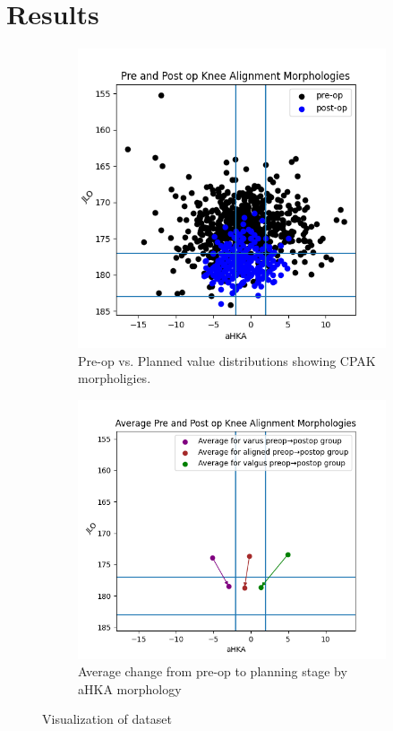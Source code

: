 \documentclass{article}
\begin{document}
	
\section{Results}

\begin{figure}[h]
	\begin{subfigure}{.45\linewidth}
		\includegraphics[width=\linewidth]{data_vis.png}
		\caption{Pre-op vs. Planned value distributions showing CPAK morpholigies.}
		\label{data_vis}
	\end{subfigure}
	\hfill
	\begin{subfigure}{.45\linewidth}
		\includegraphics[width=\linewidth]{avg_vis.png}
		\caption{Average change from pre-op to planning stage by aHKA morphology}
		\label{avg_vis}
	\end{subfigure}
	\caption{Visualization of dataset}
\end{figure}
\end{document}
